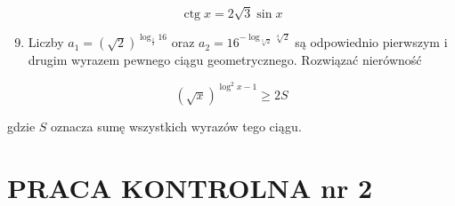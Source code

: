 \documentclass[10pt]{article}
\begin{document}
$$
\operatorname{ctg} x=2 \sqrt{3} \sin x
$$

\begin{enumerate}
  \setcounter{enumi}{8}
  \item Liczby $a_{1}=(\sqrt{2})^{\log _{\frac{1}{2}} 16}$ oraz $a_{2}=16^{-\log _{\sqrt[3]{2}} \sqrt[4]{2}}$ są odpowiednio pierwszym i drugim wyrazem pewnego ciągu geometrycznego. Rozwiązać nierówność
\end{enumerate}

$$
(\sqrt{x})^{\log ^{2} x-1} \geqslant 2 S
$$

gdzie $S$ oznacza sumę wszystkich wyrazów tego ciągu.

\section*{PRACA KONTROLNA nr 2}
\end{document}
